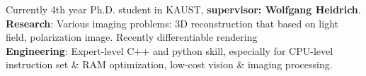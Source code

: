 

\begin{cvparagraph}

Currently 4th year Ph.D. student in KAUST, \textbf{supervisor: Wolfgang Heidrich}. \\
\textbf{Research}: Various imaging problems: 3D reconstruction that based on light field, polarization image. Recently differentiable rendering\\
\textbf{Engineering}: Expert-level C++ and python skill, especially for CPU-level instruction set \& RAM optimization, low-cost vision \& imaging processing.  
\end{cvparagraph}
